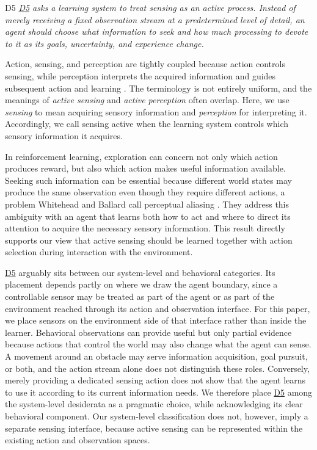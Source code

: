 \documentclass[10pt,journal,compsoc]{IEEEtran}
\DeclareRobustCommand{\Dref}[1]{\hyperref[sec:d#1]{D#1}}
\begin{document}
\begin{briefbox}[boundarybrief]{D5}
    \emph{\Dref{5} asks a learning system to treat sensing as an active process.
    Instead of merely receiving a fixed observation stream at a predetermined level of detail, an agent should choose what information to seek and how much processing to devote to it as its goals, uncertainty, and experience change.}
\end{briefbox}

\noindent Action, sensing, and perception are tightly coupled because action controls sensing, while perception interprets the acquired information and guides subsequent action and learning \cite{bajcsy1988,bajcsy1992}.
The terminology is not entirely uniform, and the meanings of \emph{active sensing} and \emph{active perception} often overlap.
Here, we use \emph{sensing} to mean acquiring sensory information and \emph{perception} for interpreting it.
Accordingly, we call sensing active when the learning system controls which sensory information it acquires.

In reinforcement learning, exploration can concern not only which action produces reward, but also which action makes useful information available.
Seeking such information can be essential because different world states may produce the same observation even though they require different actions, a problem Whitehead and Ballard call perceptual aliasing \cite{whitehead1990}.
They address this ambiguity with an agent that learns both how to act and where to direct its attention to acquire the necessary sensory information.
This result directly supports our view that active sensing should be learned together with action selection during interaction with the environment.

\Dref{5} arguably sits between our system-level and behavioral categories.
Its placement depends partly on where we draw the agent boundary, since a controllable sensor may be treated as part of the agent or as part of the environment reached through its action and observation interface.
For this paper, we place sensors on the environment side of that interface rather than inside the learner.
Behavioral observations can provide useful but only partial evidence because actions that control the world may also change what the agent can sense.
A movement around an obstacle may serve information acquisition, goal pursuit, or both, and the action stream alone does not distinguish these roles.
Conversely, merely providing a dedicated sensing action does not show that the agent learns to use it according to its current information needs.
We therefore place \Dref{5} among the system-level desiderata as a pragmatic choice, while acknowledging its clear behavioral component.
Our system-level classification does not, however, imply a separate sensing interface, because active sensing can be represented within the existing action and observation spaces.
\end{document}

